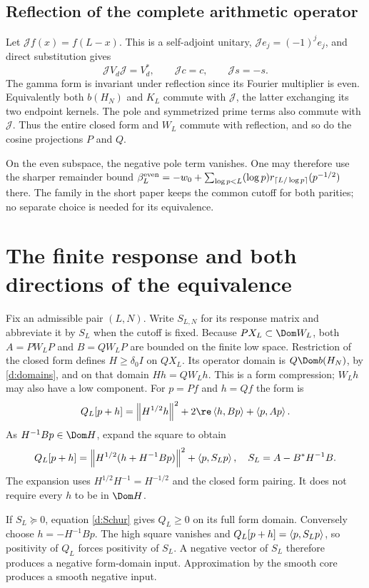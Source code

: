 \subsection{Reflection of the complete arithmetic operator}
Let $\mathcal Jf(x)=f(L-x)$. This is a self-adjoint unitary,
$\mathcal Je_j=(-1)^je_j$, and direct substitution gives
\[
\mathcal JV_d\mathcal J=V_d^*,\qquad
\mathcal Jc=c,\qquad \mathcal Js=-s.
\]
The gamma form is invariant under reflection since its Fourier
multiplier is even. Equivalently both $b(H_N)$ and $K_L$ commute
with $\mathcal J$, the latter exchanging its two endpoint kernels.
The pole and symmetrized prime terms also commute with $\mathcal J$.
Thus the entire closed form and $W_L$ commute with reflection, and so
do the cosine projections $P$ and $Q$.

On the even subspace, the negative pole term vanishes. One may therefore
use the sharper remainder bound
$\beta_L^{\rm even}=-w_0+\sum_{\log p<L}(\log p)
r_{\lceil L/\log p\rceil}(p^{-1/2})$ there.
The family in the short paper keeps the common cutoff for both parities;
no separate choice is needed for its equivalence.

\section{The finite response and both directions of the equivalence}
Fix an admissible pair $(L,N)$. Write $S_{L,N}$ for its response matrix
and abbreviate it by $S_L$ when the cutoff is fixed.
Because $PX_L\subset\Dom W_L$, both $A=PW_LP$ and $B=QW_LP$ are bounded
on the finite low space. Restriction of the closed form defines
$H\ge\delta_0I$ on $QX_L$. Its operator domain is
$Q\Dom b(H_N)$, by \eqref{d:domains}, and on that domain $Hh=QW_Lh$.
This is a form compression; $W_Lh$ may also have a low component.
For $p=Pf$ and $h=Qf$ the form is
\[
Q_L[p+h]=\norm{H^{1/2}h}^2+2\re\ip h{Bp}+\ip p{Ap}.
\]
As $H^{-1}Bp\in\Dom H$, expand the square to obtain
\begin{equation}\label{d:Schur}
Q_L[p+h]=\left\lVert H^{1/2}(h+H^{-1}Bp)\right\rVert^2+\left\langle p,S_Lp\right\rangle,
\quad S_L=A-B^*H^{-1}B.
\end{equation}
The expansion uses $H^{1/2}H^{-1}=H^{-1/2}$ and the closed form pairing.
It does not require every $h$ to be in $\Dom H$.

If $S_L\succeq0$, equation \eqref{d:Schur} gives $Q_L\ge0$ on its full
form domain. Conversely choose $h=-H^{-1}Bp$. The high square vanishes
and $Q_L[p+h]=\left\langle p,S_Lp\right\rangle$, so positivity of $Q_L$ forces positivity of
$S_L$. A negative vector of $S_L$ therefore produces a negative form-domain
input. Approximation by the smooth core produces a smooth negative input.

